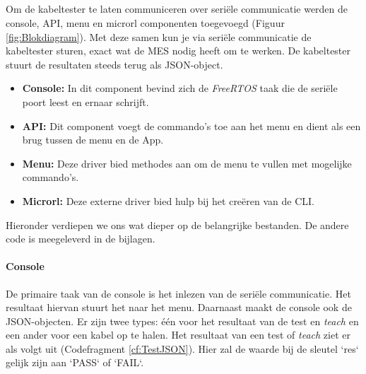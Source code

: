 \newpage
\subsection{}%
\label{ssec:UitwerkingMES}

\subsubsection{}%
\label{sssec:AanpassigenKabeltester}

Om de kabeltester te laten communiceren over seriële communicatie werden de console, API, menu en microrl componenten toegevoegd (Figuur \ref{fig:Blokdiagram}). Met deze samen kun je via seriële communicatie de kabeltester sturen, exact wat de \gls{MES} nodig heeft om te werken. De kabeltester stuurt de resultaten steeds terug als JSON-object.

\begin{itemize}[]
    \item \textbf{Console:} In dit component bevind zich de \textit{FreeRTOS} taak die de seriële poort leest en ernaar schrijft.
    \item \textbf{API:} Dit component voegt de commando's toe aan het menu en dient als een brug tussen de menu en de App.
    \item \textbf{Menu:} Deze driver bied methodes aan om de menu te vullen met mogelijke commando's.
    \item \textbf{Microrl\autocite{Microrl2011}:} Deze externe driver bied hulp bij het creëren van de \gls{CLI}.
\end{itemize}

Hieronder verdiepen we ons wat dieper op de belangrijke bestanden. De andere code is meegeleverd in de bijlagen. 

\paragraph{Console}

De primaire taak van de console is het inlezen van de seriële communicatie. Het resultaat hiervan stuurt het naar het menu. Daarnaast maakt de console ook de JSON-objecten. Er zijn twee types: één voor het resultaat van de test en \textit{teach} en een ander voor een kabel op te halen. Het resultaat van een test of \textit{teach} ziet er als volgt uit (Codefragment \ref{cf:TestJSON}). Hier zal de waarde bij de sleutel `res` gelijk zijn aan `PASS` of `FAIL`.

